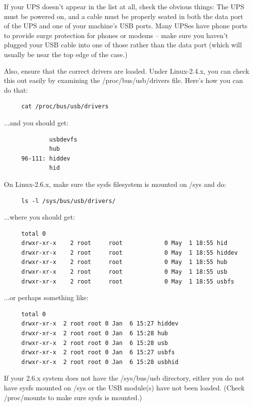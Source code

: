 If your UPS doesn't appear in the list at all, check the obvious things:
The UPS must be powered on, and a cable must be properly seated in both the
data port of the UPS and one of your machine's USB ports. Many UPSes have 
phone ports to provide surge protection for phones or modems {--} make
sure you haven't plugged your USB cable into one of those rather than the
data port (which will usually be near the top edge of the case.)  

Also, ensure that the correct drivers are loaded. Under Linux-2.4.x, you can
check this out easily by examining the /proc/bus/usb/drivers file.  Here's
how you can do that: 

\begin{verbatim}
     cat /proc/bus/usb/drivers
\end{verbatim}

...and you should get:

\begin{verbatim}
             usbdevfs
             hub
     96-111: hiddev
             hid
\end{verbatim}

On Linux-2.6.x, make sure the sysfs filesystem is mounted on /sys and do: 

\begin{verbatim}
     ls -l /sys/bus/usb/drivers/
\end{verbatim}

...where you should get:

\begin{verbatim}
     total 0
     drwxr-xr-x    2 root     root            0 May  1 18:55 hid
     drwxr-xr-x    2 root     root            0 May  1 18:55 hiddev
     drwxr-xr-x    2 root     root            0 May  1 18:55 hub
     drwxr-xr-x    2 root     root            0 May  1 18:55 usb
     drwxr-xr-x    2 root     root            0 May  1 18:55 usbfs
\end{verbatim}

...or perhaps something like:

\begin{verbatim}
     total 0
     drwxr-xr-x  2 root root 0 Jan  6 15:27 hiddev
     drwxr-xr-x  2 root root 0 Jan  6 15:28 hub
     drwxr-xr-x  2 root root 0 Jan  6 15:28 usb
     drwxr-xr-x  2 root root 0 Jan  6 15:27 usbfs
     drwxr-xr-x  2 root root 0 Jan  6 15:28 usbhid
\end{verbatim}

If your 2.6.x system does not have the /sys/bus/usb directory, either you do
not have sysfs mounted on /sys or the USB module(s) have not been loaded. 
(Check /proc/mounts to make sure sysfs is mounted.)  

